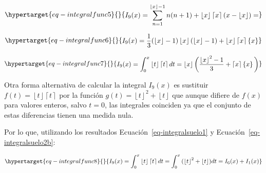 \documentclass[
  letterpaper,
  DIV=11,
  numbers=noendperiod]{scrreprt}
\begin{document}
\begin{equation}\protect\hypertarget{eq-integralfunc5}{}{
\begin{multline}
I_{9}(x) = 
\sum_{n=1}^{\left\lfloor x \right\rfloor-1}{n(n+1)} +
\left\lfloor x \right\rfloor \left\lceil  x \right\rceil (x-\left\lfloor x \right\rfloor) =
\end{multline}
}\label{eq-integralfunc5}\end{equation}

\begin{equation}\protect\hypertarget{eq-integralfunc6}{}{
\begin{multline}
I_{9}(x) = 
\frac{1}{3} (\left\lfloor x \right\rfloor-1)\left\lfloor x \right\rfloor(\left\lfloor x \right\rfloor-1) + 
\left\lfloor x \right\rfloor \left\lceil  x \right\rceil \left\{ x \right\}
\end{multline}
}\label{eq-integralfunc6}\end{equation}

\begin{equation}\protect\hypertarget{eq-integralfunc7}{}{
\begin{multline}
I_{9}(x) = \int_0^x \left\lfloor t \right\rfloor \left\lceil  t \right\rceil dt =
\left\lfloor x \right\rfloor \bigg(\frac{\left\lfloor x \right\rfloor^2-1}{3} + \left\lceil  x \right\rceil \left\{ x \right\}\bigg)
\end{multline}
}\label{eq-integralfunc7}\end{equation}

Otra forma alternativa de calcular la integral \(I_{9}(x)\) es sustituir
\(f(t) = \left\lfloor t \right\rfloor \left\lceil  t \right\rceil\) por
la función
\(g(t) = \left\lfloor t \right\rfloor^2 + \left\lfloor t \right\rfloor\)
que aunque difiere de \(f(x)\) para valores enteros, salvo \(t=0\), las
integrales coinciden ya que el conjunto de estas diferencias tienen una
medida nula.

Por lo que, utilizando los resultados Ecuación~\ref{eq-integralsuelo1} y
Ecuación~\ref{eq-integralsuelo2b}:

\begin{equation}\protect\hypertarget{eq-integralfunc8}{}{
\begin{multline}
I_{9}(x) = \int_0^x \left\lfloor t \right\rfloor \left\lceil  t \right\rceil dt =
\int_{0}^{x}{(\left\lfloor t \right\rfloor^{2} + \left\lfloor t \right\rfloor) dt} =
I_{6}(x) + I_{1}(x)
\end{multline}
}\label{eq-integralfunc8}\end{equation}
\end{document}
